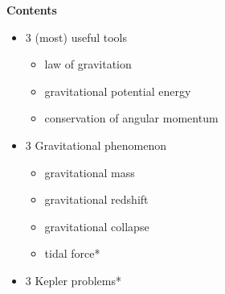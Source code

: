 \documentclass[11pt, a4paper, oneside]{book}
\numberwithin{equation}{section}%
\begin{document}
\textbf{Contents}
\begin{itemize}
	\item 3 (most) useful tools
		\begin{itemize}
			\item law of gravitation
			\item gravitational potential energy\\
			\item conservation of angular momentum
		\end{itemize}
	\item 3 Gravitational phenomenon
		\begin{itemize}
			\item gravitational mass
			\item gravitational redshift
			\item gravitational collapse
			\item tidal force*
		\end{itemize}
	\item 3 Kepler problems*

\end{itemize}
\end{document}
